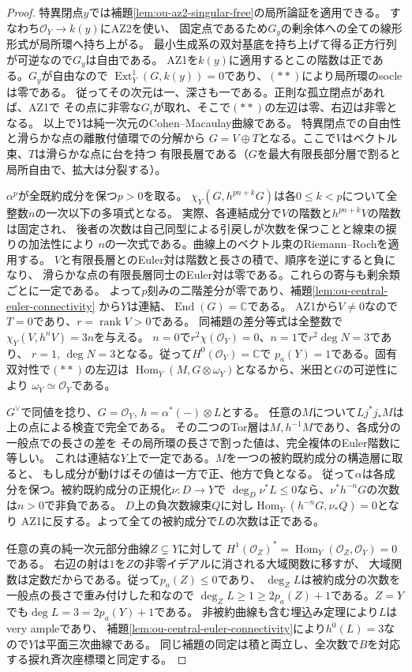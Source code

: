 \documentclass[11pt,a4paper]{ltjsarticle}
\theoremstyle{definition}
\begin{document}
\begin{proof}
特異閉点$y$では補題\ref{lem:ou-az2-singular-free}の局所論証を適用できる。
すなわち$\mathcal O_Y\to k(y)$にAZ2を使い、
固定点であるため$G_y$の剰余体への全ての線形形式が局所環へ持ち上がる。
最小生成系の双対基底を持ち上げて得る正方行列が可逆なので$G_y$は自由である。
AZ1を$k(y)$に適用するとこの階数は正である。$G_y$が自由なので
$\operatorname{Ext}^1_Y(G,k(y))=0$であり、$(**)$により局所環のsocleは零である。
従ってその次元は一、深さも一である。正則な孤立閉点があれば、AZ1で
その点に非零な$G_i$が取れ、そこで$(**)$の左辺は零、右辺は非零となる。
以上で$Y$は純一次元のCohen--Macaulay曲線である。
特異閉点での自由性と滑らかな点の離散付値環での分解から
$G=V\oplus T$となる。ここで$V$はベクトル束、$T$は滑らかな点に台を持つ
有限長層である（$G$を最大有限長部分層で割ると局所自由で、拡大は分裂する）。

$\alpha^p$が全既約成分を保つ$p>0$を取る。
$\chi_Y(G,h^{pn+k}G)$は各$0\le k<p$について全整数$n$の一次以下の多項式となる。
実際、各連結成分で$V$の階数と$h^{pn+k}V$の階数は固定され、
後者の次数は自己同型による引戻しが次数を保つことと線束の捩りの加法性により
$n$の一次式である。曲線上のベクトル束のRiemann--Rochを適用する。
$V$と有限長層とのEuler対は階数と長さの積で、順序を逆にすると負になり、
滑らかな点の有限長層同士のEuler対は零である。これらの寄与も剰余類ごとに一定である。
よって$p$刻みの二階差分が零であり、補題\ref{lem:ou-central-euler-connectivity}
から$Y$は連結、$\operatorname{End}(G)=\mathbb C$である。
AZ1から$V\ne0$なので$T=0$であり、$r=\operatorname{rank}V>0$である。
同補題の差分等式は全整数で$\chi_Y(V,h^nV)=3n$を与える。
$n=0$で$r^2\chi(\mathcal O_Y)=0$、$n=1$で$r^2\deg N=3$であり、
$r=1$, $\deg N=3$となる。従って$H^0(\mathcal O_Y)=\mathbb C$で
$p_a(Y)=1$である。固有双対性で$(**)$の左辺は
$\operatorname{Hom}_Y(M,G\otimes\omega_Y)$となるから、米田と$G$の可逆性により
$\omega_Y\simeq\mathcal O_Y$である。

$G^\vee$で同値を捻り、$G=\mathcal O_Y$, $h=\alpha^*(-)\otimes L$とする。
任意の$M$について$Lj^*j_*M$は上の点による検査で完全である。
その二つのTor層は$M,h^{-1}M$であり、各成分の一般点での長さの差を
その局所環の長さで割った値は、完全複体のEuler階数に等しい。
これは連結な$Y$上で一定である。$M$を一つの被約既約成分の構造層に取ると、
もし成分が動けばその値は一方で正、他方で負となる。
従って$\alpha$は各成分を保つ。被約既約成分の正規化$\nu:D\to Y$で
$\deg_D\nu^*L\le0$なら、$\nu^*h^{-n}G$の次数は$n>0$で非負である。
$D$上の負次数線束$Q$に対し$\operatorname{Hom}_Y(h^{-n}G,\nu_*Q)=0$となり
AZ1に反する。よって全ての被約成分で$L$の次数は正である。

任意の真の純一次元部分曲線$Z\subsetneq Y$に対して
$H^1(\mathcal O_Z)^*=\operatorname{Hom}_Y(\mathcal O_Z,\mathcal O_Y)=0$である。
右辺の射は$1$を$Z$の非零イデアルに消される大域関数に移すが、
大域関数は定数だからである。従って$p_a(Z)\le0$であり、
$\deg_ZL$は被約成分の次数を一般点の長さで重み付けした和なので
$\deg_ZL\ge1\ge2p_a(Z)+1$である。$Z=Y$でも$\deg L=3=2p_a(Y)+1$である。
非被約曲線も含む埋込み定理\cite[Theorem~1.1]{CFHR1999}により$L$はvery ampleであり、
補題\ref{lem:ou-central-euler-connectivity}により$h^0(L)=3$なので$Y$は平面三次曲線である。
同じ補題の同定は積と両立し、全次数で$B$を対応する捩れ斉次座標環と同定する。


\end{proof}
\end{document}
